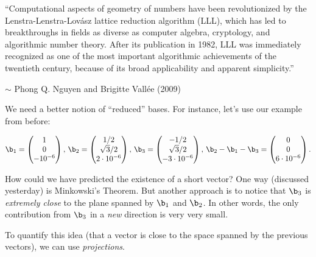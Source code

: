 
\begin{displayquote}
	``Computational aspects of geometry of numbers have been revolutionized by the 	Lenstra-Lenstra-Lov\'asz lattice reduction algorithm (LLL), which has led to breakthroughs in fields as diverse as computer algebra, cryptology, and algorithmic number theory. After its publication in 1982, LLL was immediately recognized as one of the most important algorithmic achievements of the twentieth century, because of its broad applicability and apparent simplicity.''
\end{displayquote}
\begin{flushright}\small
	$\sim$ Phong Q. Nguyen and Brigitte Vall\'ee (2009)
\end{flushright}

We need a better notion of ``reduced'' bases. For instance, let's use our example from before:

\[\b_1=\begin{pmatrix}
1\\0\\-10^{-6}
\end{pmatrix},\,\b_2=\begin{pmatrix}
1/2 \\ \sqrt{3}/2 \\ 2\cdot 10^{-6}
\end{pmatrix},\,\b_3=\begin{pmatrix}
-1/2 \\ \sqrt{3}/2 \\ -3\cdot 10^{-6}
\end{pmatrix},\,\b_2-\b_1-\b_3=\begin{pmatrix}
0 \\ 0 \\ 6\cdot 10^{-6}
\end{pmatrix}.\]

How could we have predicted the existence of a short vector? One way (discussed yesterday) is Minkowski's Theorem. But another approach is to notice that $\b_3$ is \emph{extremely close} to the plane spanned by $\b_1$ and $\b_2$. In other words, the only contribution from $\b_3$ in a \emph{new} direction is very very small.

To quantify this idea (that a vector is close to the space spanned by the previous vectors), we can use \emph{projections}.

